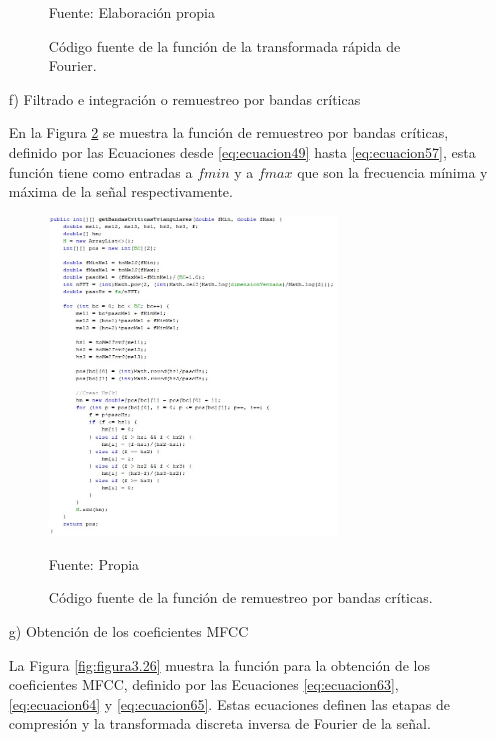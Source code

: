 \begin{enumerate}
\begin{figure}[H]
\begin{center}
\end{center}
\begin{center}
\vskip -0.5cm
\caption{\small{Código fuente de la función de la transformada rápida de Fourier.}}
\label{fig:figura3.23}
{\small{Fuente: Elaboración propia}}
\end{center}
\end{figure}
\vskip -0.5cm
\item[f)]Filtrado e integración o remuestreo por bandas críticas
\par
En la Figura \ref{fig:figura3.25} se muestra la función de remuestreo por bandas críticas, definido por las Ecuaciones desde \eqref{eq:ecuacion49} hasta \eqref{eq:ecuacion57}, esta función tiene como entradas a $fmin$ y a $fmax$ que son la frecuencia mínima y máxima de la señal respectivamente.
\begin{figure}[H]
\captionsetup{justification=centering}
\begin{center}
\includegraphics[width=0.72\textwidth]{Imagenes/Cap3/image025}
\end{center}
\begin{center}
\vskip -0.5cm
\caption{\small{Código fuente de la función de remuestreo por bandas críticas.}}
\label{fig:figura3.25}
{\small{Fuente: Propia}}
\end{center}
\end{figure}
\newpage
\item[g)]Obtención de los coeficientes MFCC
\par
La Figura \ref{fig:figura3.26} muestra la función para la obtención de los coeficientes MFCC, definido por las Ecuaciones \eqref{eq:ecuacion63}, \eqref{eq:ecuacion64} y \eqref{eq:ecuacion65}. Estas ecuaciones definen las etapas de compresión y la transformada discreta inversa de Fourier de la señal.

\end{enumerate}
